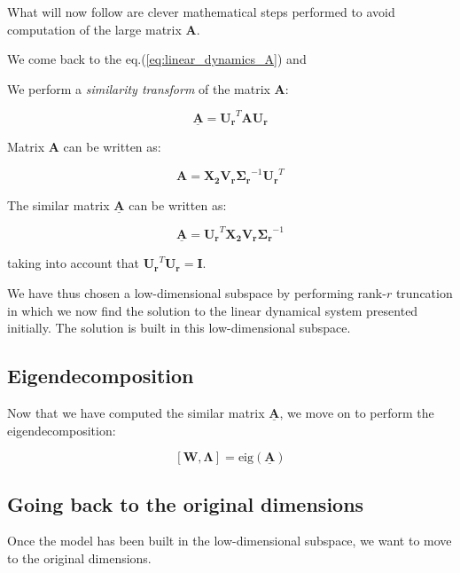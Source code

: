 \documentclass[10pt,twocolumn]{article}
\begin{document}
What will now follow are clever mathematical steps performed to avoid computation of the large matrix $\bm{A}$.

We come back to the eq.(\ref{eq:linear_dynamics_A}) and

We perform a \textit{similarity transform} of the matrix $\bm{A}$:

\begin{equation} \label{eq:similarity-transform}
\underline{\bm{A}} = \bm{U_r}^T \bm{A} \bm{U_r}
\end{equation}

Matrix $\bm{A}$ can be written as:

\begin{equation} \label{eq:A}
\bm{A} = \bm{X_2} \bm{V_r} \bm{\Sigma_r}^{-1} \bm{U_r}^T
\end{equation}

The similar matrix $\underline{\bm{A}}$ can be written as:

\begin{equation} \label{eq:A_underline}
\underline{\bm{A}} = \bm{U_r}^T \bm{X_2} \bm{V_r} \bm{\Sigma_r}^{-1} 
\end{equation}

taking into account that $\bm{U_r}^T \bm{U_r} = \bm{I}$.

We have thus chosen a low-dimensional subspace by performing rank-$r$ truncation in which we now find the solution to the linear dynamical system presented initially. The solution is built in this low-dimensional subspace.

\subsection{Eigendecomposition}

Now that we have computed the similar matrix $\underline{\bm{A}}$, we move on to perform the eigendecomposition:

\begin{equation} \label{eq:A_underline}
[\bm{W}, \bm{\Lambda}] = \text{eig}(\underline{\bm{A}})
\end{equation}

\subsection{Going back to the original dimensions}

Once the model has been built in the low-dimensional subspace, we want to move to the original dimensions. 
\end{document}
